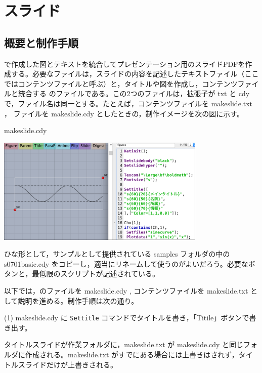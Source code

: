 \documentclass[papersize,a4paper,12pt,uplatex]{jsarticle}
\begin{document}
\section{\ketcindy スライド}
\subsection{概要と制作手順}
\ketcindy で作成した図とテキストを統合してプレゼンテーション用のスライドPDFを作成する。必要なファイルは，スライドの内容を記述したテキストファイル（ここではコンテンツファイルと呼ぶ）と，タイトルや図を作成し，コンテンツファイルと統合する \ketcindy のファイルである。この2つのファイルは，拡張子が txt と cdy で，ファイル名は同一とする。たとえば，コンテンツファイルを makeslide.txt ， \ketcindy ファイルを makeslide.cdy としたときの，制作イメージを次の図に示す。

\hspace{10mm}

\hspace{10mm}makeslide.cdy

\hspace{10mm}\includegraphics[bb=0.00 0.00 881.05 451.02,width=10cm]{Fig/slide01.pdf} 

\vspace{\baselineskip}
ひな形として，サンプルとして提供されている samples フォルダの中の s0701basic.cdy をコピーし，適当にリネームして使うのがよいだろう。必要なボタンと，最低限のスクリプトが記述されている。

以下では，\ketcindy のファイルを makeslide.cdy , コンテンツファイルを makeslide.txt として説明を進める。制作手順は次の通り。

(1) makeslide.cdy に \verb|Settitle| コマンドでタイトルを書き，「Titile」ボタンで書き出す。

タイトルスライドが作業フォルダに，makeslide.txt が makeslide.cdy と同じフォルダに作成される。makeslide.txt がすでにある場合には上書きはされず，タイトルスライドだけが上書きされる。
\end{document}
